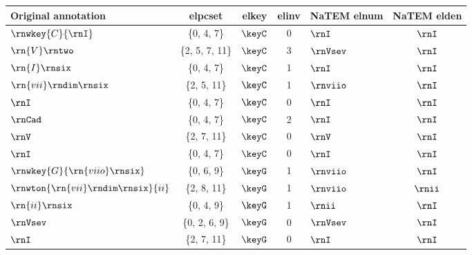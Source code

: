 \begin{tabular}{l|ccc|lc}
Original annotation                 & elpcset         & elkey   & elinv & NaTEM elnum & NaTEM elden \\ \hline
$\rnwkey{C}{\rnI}$                  & \{0, 4, 7\}     & $\keyC$ & 0     & $\rnI$      & $\rnI$           \\
$\rn{V}\rntwo$                      & \{2, 5, 7, 11\} & $\keyC$ & 3     & $\rnVsev$   & $\rnI$           \\
$\rn{I}\rnsix$                      & \{0, 4, 7\}     & $\keyC$ & 1     & $\rnI$      & $\rnI$           \\
$\rn{vii}\rndim\rnsix$              & \{2, 5, 11\}    & $\keyC$ & 1     & $\rnviio$   & $\rnI$           \\
$\rnI$                              & \{0, 4, 7\}     & $\keyC$ & 0     & $\rnI$      & $\rnI$           \\
$\rnCad$                            & \{0, 4, 7\}     & $\keyC$ & 2     & $\rnI$      & $\rnI$           \\
$\rnV$                              & \{2, 7, 11\}    & $\keyC$ & 0     & $\rnV$      & $\rnI$           \\
$\rnI$                              & \{0, 4, 7\}     & $\keyC$ & 0     & $\rnI$      & $\rnI$           \\
$\rnwkey{G}{\rn{viio}\rnsix}$       & \{0, 6, 9\}     & $\keyG$ & 1     & $\rnviio$   & $\rnI$           \\
$\rnwton{\rn{vii}\rndim\rnsix}{ii}$ & \{2, 8, 11\}    & $\keyG$ & 1     & $\rnviio$   & $\rnii$          \\
$\rn{ii}\rnsix$                     & \{0, 4, 9\}     & $\keyG$ & 1     & $\rnii$     & $\rnI$           \\
$\rnVsev$                           & \{0, 2, 6, 9\}  & $\keyG$ & 0     & $\rnVsev$   & $\rnI$           \\
$\rnI$                              & \{2, 7, 11\}    & $\keyG$ & 0     & $\rnI$      & $\rnI$          
\end{tabular}
